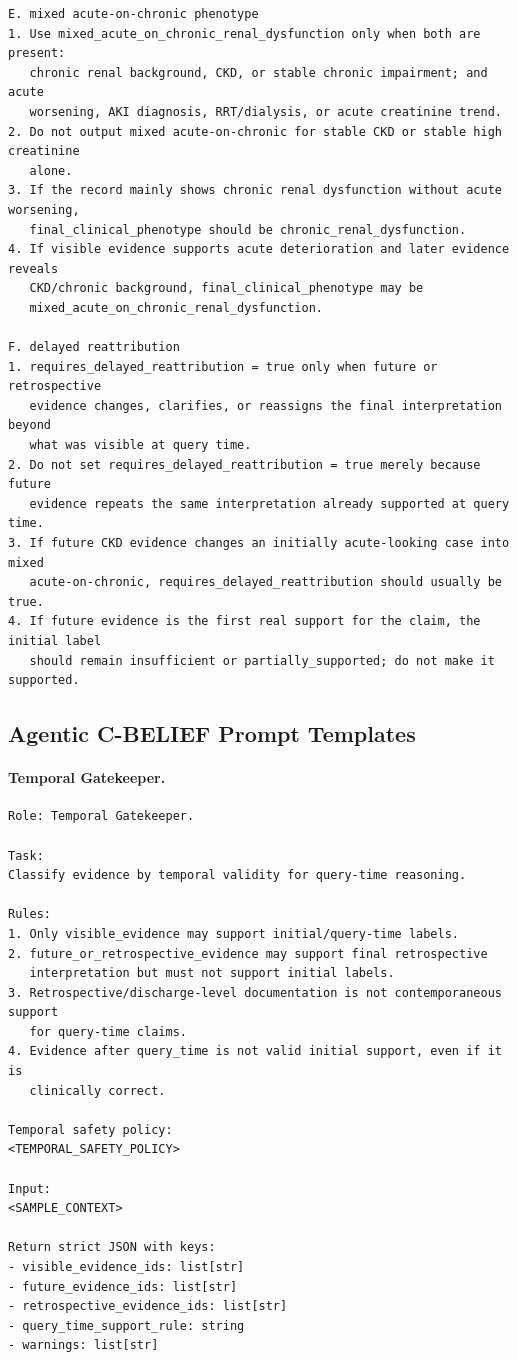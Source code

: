 \begin{verbatim}
E. mixed acute-on-chronic phenotype
1. Use mixed_acute_on_chronic_renal_dysfunction only when both are present:
   chronic renal background, CKD, or stable chronic impairment; and acute
   worsening, AKI diagnosis, RRT/dialysis, or acute creatinine trend.
2. Do not output mixed acute-on-chronic for stable CKD or stable high creatinine
   alone.
3. If the record mainly shows chronic renal dysfunction without acute worsening,
   final_clinical_phenotype should be chronic_renal_dysfunction.
4. If visible evidence supports acute deterioration and later evidence reveals
   CKD/chronic background, final_clinical_phenotype may be
   mixed_acute_on_chronic_renal_dysfunction.

F. delayed reattribution
1. requires_delayed_reattribution = true only when future or retrospective
   evidence changes, clarifies, or reassigns the final interpretation beyond
   what was visible at query time.
2. Do not set requires_delayed_reattribution = true merely because future
   evidence repeats the same interpretation already supported at query time.
3. If future CKD evidence changes an initially acute-looking case into mixed
   acute-on-chronic, requires_delayed_reattribution should usually be true.
4. If future evidence is the first real support for the claim, the initial label
   should remain insufficient or partially_supported; do not make it supported.
\end{verbatim}

\subsection{Agentic C-BELIEF Prompt Templates}
\label{app:agentic_prompts}

\paragraph{Temporal Gatekeeper.}
\begin{verbatim}
Role: Temporal Gatekeeper.

Task:
Classify evidence by temporal validity for query-time reasoning.

Rules:
1. Only visible_evidence may support initial/query-time labels.
2. future_or_retrospective_evidence may support final retrospective
   interpretation but must not support initial labels.
3. Retrospective/discharge-level documentation is not contemporaneous support
   for query-time claims.
4. Evidence after query_time is not valid initial support, even if it is
   clinically correct.

Temporal safety policy:
<TEMPORAL_SAFETY_POLICY>

Input:
<SAMPLE_CONTEXT>

Return strict JSON with keys:
- visible_evidence_ids: list[str]
- future_evidence_ids: list[str]
- retrospective_evidence_ids: list[str]
- query_time_support_rule: string
- warnings: list[str]
\end{verbatim}

